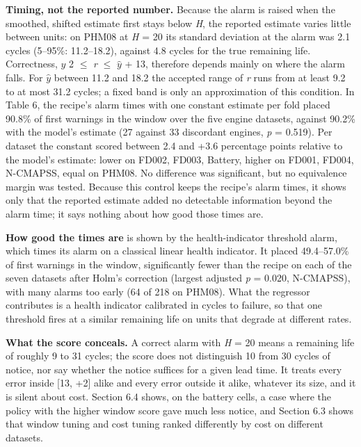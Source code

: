 \documentclass[a4paper,fleqn,doubleblind]{cas-dc}
\begin{document}
\textbf{Timing, not the reported number.} Because the alarm is raised when the smoothed, shifted estimate first stays below \textit{H}, the reported estimate varies little between units: on PHM08 at \textit{H} = 20 its standard deviation at the alarm was 2.1 cycles (5--95\%: 11.2--18.2), against 4.8 cycles for the true remaining life. Correctness, $\hat{y}$ \textminus{} 2 $\le$ \textit{r} $\le$ $\hat{y}$ + 13, therefore depends mainly on where the alarm falls. For $\hat{y}$ between 11.2 and 18.2 the accepted range of \textit{r} runs from at least 9.2 to at most 31.2 cycles; a fixed band is only an approximation of this condition. In Table 6, the recipe's alarm times with one constant estimate per fold placed 90.8\% of first warnings in the window over the five engine datasets, against 90.2\% with the model's estimate (27 against 33 discordant engines, \textit{p} = 0.519). Per dataset the constant scored between \textminus{}2.4 and +3.6 percentage points relative to the model's estimate: lower on FD002, FD003, Battery, higher on FD001, FD004, N-CMAPSS, equal on PHM08. No difference was significant, but no equivalence margin was tested. Because this control keeps the recipe's alarm times, it shows only that the reported estimate added no detectable information beyond the alarm time; it says nothing about how good those times are.

\textbf{How good the times are} is shown by the health-indicator threshold alarm, which times its alarm on a classical linear health indicator. It placed 49.4--57.0\% of first warnings in the window, significantly fewer than the recipe on each of the seven datasets after Holm's correction (largest adjusted \textit{p} = 0.020, N-CMAPSS), with many alarms too early (64 of 218 on PHM08). What the regressor contributes is a health indicator calibrated in cycles to failure, so that one threshold fires at a similar remaining life on units that degrade at different rates.

\textbf{What the score conceals.} A correct alarm with \textit{H} = 20 means a remaining life of roughly 9 to 31 cycles; the score does not distinguish 10 from 30 cycles of notice, nor say whether the notice suffices for a given lead time. It treats every error inside [\textminus{}13, +2] alike and every error outside it alike, whatever its size, and it is silent about cost. Section 6.4 shows, on the battery cells, a case where the policy with the higher window score gave much less notice, and Section 6.3 shows that window tuning and cost tuning ranked differently by cost on different datasets.
\end{document}
